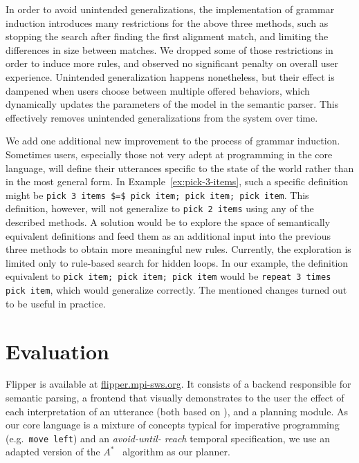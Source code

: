 \documentclass[letterpaper, 10 pt, conference]{ieeeconf}  %
\newcommand{\tool}{Flipper\xspace}
\begin{document}
%
In order to avoid unintended generalizations, the implementation
of grammar induction introduces many restrictions for the above three methods, 
such as stopping the search after finding the
first alignment match, and limiting the differences in size between matches.
We dropped some of those restrictions in order to induce more rules,
and observed no significant penalty on overall user experience.
Unintended generalization happens nonetheless, but their effect is dampened when
users choose between multiple offered behaviors, which dynamically updates the
parameters of the model in the semantic parser.
This effectively removes unintended generalizations from the system over time.

We add one additional new improvement to the process of grammar induction.
Sometimes users, especially those not very adept at programming in the core
language, will define their utterances specific to the state of the world rather
than in the most general form.
In Example~\ref{ex:pick-3-items}, such a specific definition might be
\lstinline{pick 3 items $=$ pick item; pick item; pick item}. This definition,
however, will not generalize to
\lstinline{pick 2 items} using any of the described methods.
A solution would be to explore the space of semantically equivalent definitions and feed them as an additional
input into the previous three methods to obtain more meaningful new rules.
Currently, the exploration is limited only to rule-based search for hidden loops. In our
example, the definition equivalent to \lstinline{pick item; pick item; pick item}
would be \lstinline{repeat 3 times pick item}, which would generalize
correctly. The mentioned changes turned out to be useful in practice.

\section{Evaluation}

\tool is available at \url{flipper.mpi-sws.org}. It consists of a backend
responsible for semantic parsing, a frontend that visually demonstrates to the user the effect of each interpretation of an utterance (both based on \cite{wangVoxelurn}), and a planning module.
As our core language is a mixture of concepts typical for
imperative programming (e.g.\ \lstinline{move left}) and an \textit{avoid-until-
reach} temporal specification, we use an adapted version of the
$A^*$~\cite{hipsterHeuristicPlanner} algorithm as our planner. 
\end{document}
